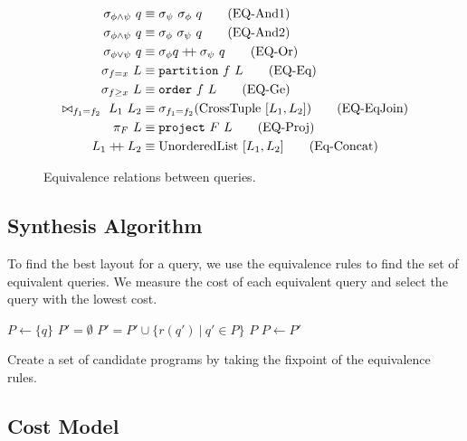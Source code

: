 \begin{figure}
  \begin{align}
    \sigma_{\phi \land \psi}\ q &\equiv \sigma_\psi\ \sigma_\phi\ q \tag{EQ-And1} \\
    \sigma_{\phi \land \psi}\ q &\equiv \sigma_\phi\ \sigma_\psi \ q \tag{EQ-And2} \\
    \sigma_{\phi \lor \psi}\ q &\equiv \sigma_\phi q \mathbin{+\!\!+} \sigma_\psi\ q \tag{EQ-Or} \\
    \sigma_{f = x}\ L &\equiv \texttt{partition}\ f\ L \tag{EQ-Eq} \\
    \sigma_{f \geq x}\ L &\equiv \texttt{order}\ f\ L \tag{EQ-Ge} \\
    \bowtie_{f_1 = f_2}\ L_1\ L_2 &\equiv \sigma_{f_1 = f_2} (\text{CrossTuple}\ [L_1, L_2]) \tag{EQ-EqJoin} \\
    \pi_F\ L &\equiv \texttt{project}\ F\ L \tag{EQ-Proj} \\
    L_1 \mathbin{+\!\!+} L_2 &\equiv \text{UnorderedList}\ [L_1, L_2] \tag{Eq-Concat}
  \end{align}
  \caption{Equivalence relations between queries.}
\end{figure}


\subsection{Synthesis Algorithm}

To find the best layout for a query, we use the equivalence rules to find the
set of equivalent queries.
We measure the cost of each equivalent query and select the query with the
lowest cost.

\begin{algorithm}
  \begin{algorithmic}
    \State $P \gets \{q\}$
    \Loop
    \State $P' = \emptyset$
    \State $P' = P' \cup \{ r(q') ~|~ q' \in P \}$
    \EndIf
    \EndFor
    \State \Return $P$
    \Else
    \State $P \gets P'$
    \EndIf
    \EndLoop
    \EndFunction
  \end{algorithmic}
  \caption{Create a set of candidate programs by taking the fixpoint of the
    equivalence rules.}
\end{algorithm}

\subsection{Cost Model}
  
